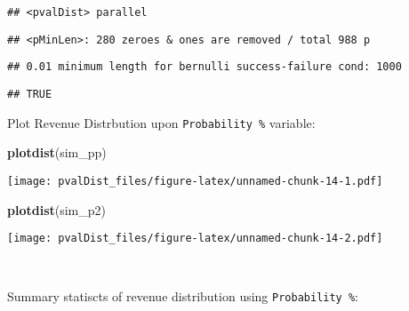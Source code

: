 \documentclass[]{article}
\newenvironment{Shaded}{\begin{snugshade}}{\end{snugshade}}
\newcommand{\DataTypeTok}[1]{\textcolor[rgb]{0.13,0.29,0.53}{#1}}
\newcommand{\DecValTok}[1]{\textcolor[rgb]{0.00,0.00,0.81}{#1}}
\newcommand{\KeywordTok}[1]{\textcolor[rgb]{0.13,0.29,0.53}{\textbf{#1}}}
\newcommand{\NormalTok}[1]{#1}
\newcommand{\OperatorTok}[1]{\textcolor[rgb]{0.81,0.36,0.00}{\textbf{#1}}}
\newcommand{\OtherTok}[1]{\textcolor[rgb]{0.56,0.35,0.01}{#1}}
\newcommand{\StringTok}[1]{\textcolor[rgb]{0.31,0.60,0.02}{#1}}
\begin{document}
\begin{Shaded}
\end{Shaded}

\begin{verbatim}
## <pvalDist> parallel
\end{verbatim}

\begin{verbatim}
## <pMinLen>: 280 zeroes & ones are removed / total 988 p
\end{verbatim}

\begin{verbatim}
## 0.01 minimum length for bernulli success-failure cond: 1000
\end{verbatim}

\begin{verbatim}
## TRUE
\end{verbatim}

Plot Revenue Distrbution upon \texttt{Probability\ \%} variable:

\begin{Shaded}
\begin{Highlighting}[]
\KeywordTok{plotdist}\NormalTok{(sim_pp)}
\end{Highlighting}
\end{Shaded}

\texttt{[image: pvalDist\_files/figure-latex/unnamed-chunk-14-1.pdf]}

\begin{Shaded}
\begin{Highlighting}[]
\KeywordTok{plotdist}\NormalTok{(sim_p2)}
\end{Highlighting}
\end{Shaded}

\texttt{[image: pvalDist\_files/figure-latex/unnamed-chunk-14-2.pdf]}

~

Summary statiscts of revenue distribution using
\texttt{Probability\ \%}:
\end{document}
